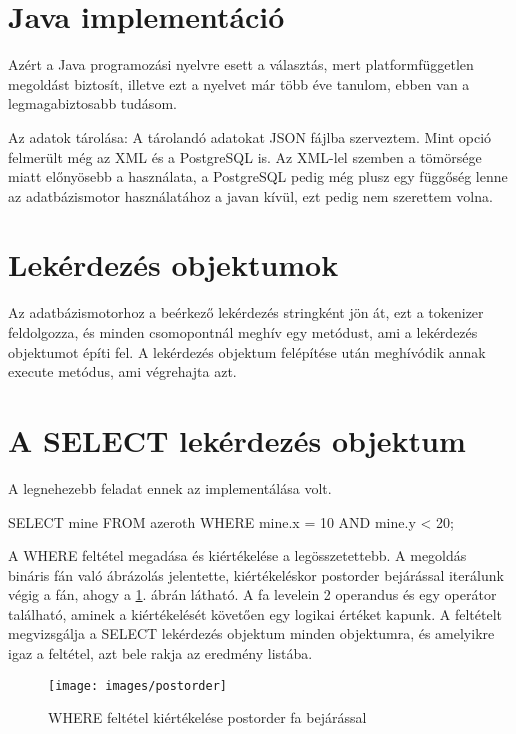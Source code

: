 
\section{Java implementáció}

Azért a Java programozási nyelvre esett a választás, mert platformfüggetlen megoldást biztosít, illetve ezt a nyelvet már több éve tanulom, ebben van a legmagabiztosabb tudásom.

Az adatok tárolása: A tárolandó adatokat JSON fájlba szerveztem. Mint opció felmerült még az XML és a PostgreSQL is.
Az XML-lel szemben a tömörsége miatt előnyösebb a használata, a PostgreSQL pedig még plusz egy függőség lenne az adatbázismotor használatához a javan kívül, ezt pedig nem szerettem volna.


\section{Lekérdezés objektumok}

Az adatbázismotorhoz a beérkező lekérdezés stringként jön át, ezt a tokenizer feldolgozza, és minden csomopontnál meghív egy metódust, ami a lekérdezés objektumot építi fel. A lekérdezés objektum felépítése után meghívódik annak execute metódus, ami végrehajta azt.

\section{A SELECT lekérdezés objektum}

A legnehezebb feladat ennek az implementálása volt.

\begin{sql}
	SELECT mine FROM azeroth WHERE mine.x = 10 AND mine.y < 20;
\end{sql}

A WHERE feltétel megadása és kiértékelése a legösszetettebb.
A megoldás bináris fán való ábrázolás jelentette, kiértékeléskor postorder bejárással iterálunk végig a fán, ahogy a \ref{fig:postorder}. ábrán látható.
A fa levelein 2 operandus és egy operátor található, aminek a kiértékelését követően egy logikai értéket kapunk.
A feltételt megvizsgálja a SELECT lekérdezés objektum minden objektumra, és amelyikre igaz a feltétel, azt bele rakja az eredmény listába.

\begin{figure}[htb]
	\begin{center}
		\texttt{[image: images/postorder]}
		\caption{WHERE feltétel kiértékelése postorder fa bejárással}
		\label{fig:postorder}
	\end{center}
\end{figure}

